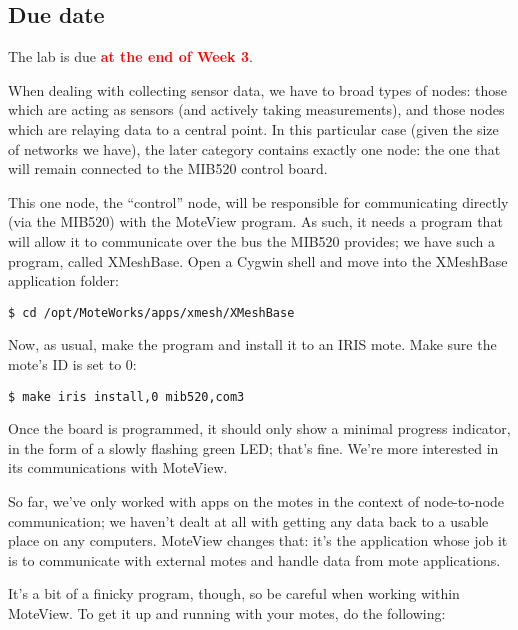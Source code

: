 \documentclass{article}
\newcommand{\labduedate}{at the end of Week 3}
\begin{document}
\subsection*{Due date}
The lab is due \textcolor{red}{\textbf{\labduedate}}.




When dealing with collecting sensor data, we have to broad types of nodes: those which are acting as sensors (and actively taking measurements), and those nodes which are relaying data to a central point. In this particular case (given the size of networks we have), the later category contains exactly one node: the one that will remain connected to the MIB520 control board.

This one node, the ``control'' node, will be responsible for communicating directly (via the MIB520) with the MoteView program. As such, it needs a program that will allow it to communicate over the bus the MIB520 provides; we have such a program, called XMeshBase. Open a Cygwin shell and move into the XMeshBase application folder:

\begin{verbatim}
$ cd /opt/MoteWorks/apps/xmesh/XMeshBase
\end{verbatim}

Now, as usual, make the program and install it to an IRIS mote. Make sure the mote's ID is set to 0:

\begin{verbatim}
$ make iris install,0 mib520,com3
\end{verbatim}

Once the board is programmed, it should only show a minimal progress indicator, in the form of a slowly flashing green LED; that's fine. We're more interested in its communications with MoteView.


So far, we've only worked with apps on the motes in the context of node-to-node communication; we haven't dealt at all with getting any data back to a usable place on any computers. MoteView changes that: it's the application whose job it is to communicate with external motes and handle data from mote applications.

It's a bit of a finicky program, though, so be careful when working within MoteView. To get it up and running with your motes, do the following:
\end{document}
